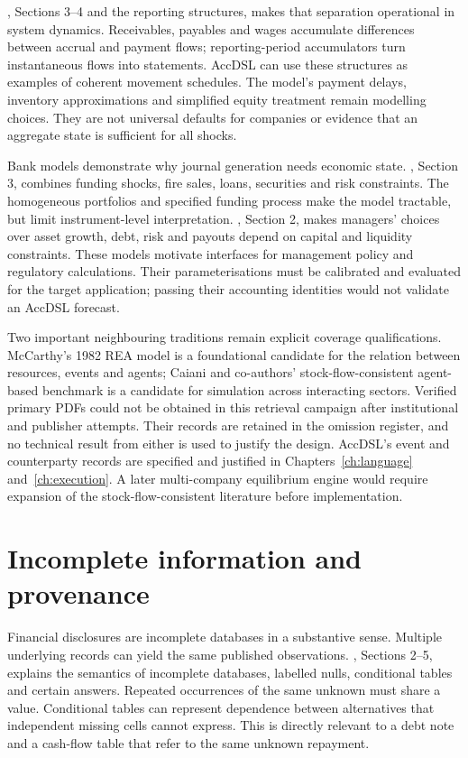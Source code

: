 \citet{pierson2020}, Sections 3--4 and the reporting structures, makes that
separation operational in system dynamics. Receivables, payables and wages
accumulate differences between accrual and payment flows; reporting-period
accumulators turn instantaneous flows into statements. AccDSL can use these
structures as examples of coherent movement schedules. The model's payment
delays, inventory approximations and simplified equity treatment remain
modelling choices. They are not universal defaults for companies or evidence
that an aggregate state is sufficient for all shocks.

Bank models demonstrate why journal generation needs economic state.
\citet{halaj2016}, Section 3, combines funding shocks, fire sales, loans,
securities and risk constraints. The homogeneous portfolios and specified
funding process make the model tractable, but limit instrument-level
interpretation. \citet{behn2019}, Section 2, makes managers' choices over asset
growth, debt, risk and payouts depend on capital and liquidity constraints.
These models motivate interfaces for management policy and regulatory
calculations. Their parameterisations must be calibrated and evaluated for
the target application; passing their accounting identities would not validate
an AccDSL forecast.

Two important neighbouring traditions remain explicit coverage qualifications.
McCarthy's 1982 REA model is a foundational candidate for the relation between
resources, events and agents; Caiani and co-authors' stock-flow-consistent
agent-based benchmark is a candidate for simulation across interacting sectors.
Verified primary PDFs could not be obtained in this retrieval campaign after
institutional and publisher attempts. Their records are retained in the omission
register, and no technical result from either is used to justify the design.
AccDSL's event and counterparty records are specified and justified in Chapters~\ref{ch:language} and~\ref{ch:execution}. A later multi-company equilibrium engine would require expansion of
the stock-flow-consistent literature before implementation.

\section{Incomplete information and provenance}

Financial disclosures are incomplete databases in a substantive sense.
Multiple underlying records can yield the same published observations.
\citet{libkin2014}, Sections 2--5, explains the semantics of incomplete
databases, labelled nulls, conditional tables and certain answers. Repeated
occurrences of the same unknown must share a value. Conditional tables can
represent dependence between alternatives that independent missing cells
cannot express. This is directly relevant to a debt note and a cash-flow table
that refer to the same unknown repayment.

